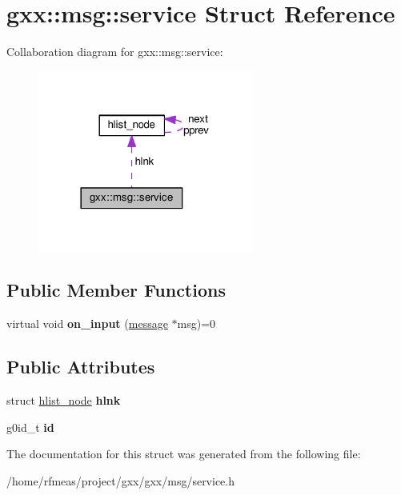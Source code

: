 \hypertarget{structgxx_1_1msg_1_1service}{}\section{gxx\+:\+:msg\+:\+:service Struct Reference}
\label{structgxx_1_1msg_1_1service}


Collaboration diagram for gxx\+:\+:msg\+:\+:service\+:
\nopagebreak
\begin{figure}[H]
\begin{center}
\leavevmode
\includegraphics[width=201pt]{structgxx_1_1msg_1_1service__coll__graph}
\end{center}
\end{figure}
\subsection*{Public Member Functions}
\begin{DoxyCompactItemize}
\item 
virtual void {\bfseries on\+\_\+input} (\hyperlink{structgxx_1_1msg_1_1message}{message} $\ast$msg)=0\hypertarget{structgxx_1_1msg_1_1service_a32f1a10152b1de5af4238568a6ed22ff}{}\label{structgxx_1_1msg_1_1service_a32f1a10152b1de5af4238568a6ed22ff}

\end{DoxyCompactItemize}
\subsection*{Public Attributes}
\begin{DoxyCompactItemize}
\item 
struct \hyperlink{structhlist__node}{hlist\+\_\+node} {\bfseries hlnk}\hypertarget{structgxx_1_1msg_1_1service_a0c5a1ca732523fb33f798d0974b8f1ed}{}\label{structgxx_1_1msg_1_1service_a0c5a1ca732523fb33f798d0974b8f1ed}

\item 
g0id\+\_\+t {\bfseries id}\hypertarget{structgxx_1_1msg_1_1service_a1cecd36ce14ec94b889bf958366a90af}{}\label{structgxx_1_1msg_1_1service_a1cecd36ce14ec94b889bf958366a90af}

\end{DoxyCompactItemize}


The documentation for this struct was generated from the following file\+:\begin{DoxyCompactItemize}
\item 
/home/rfmeas/project/gxx/gxx/msg/service.\+h\end{DoxyCompactItemize}
